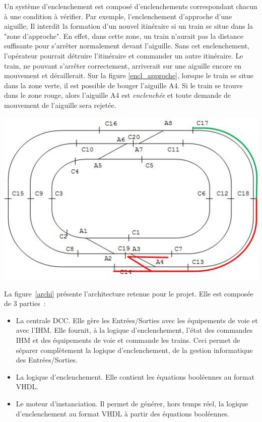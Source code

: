 Un système d'enclenchement est composé d'enclenchements correspondant
chacun à une condition à vérifier. Par exemple, l'{enclenchement
d'approche d'une aiguille}; Il interdit la formation d'un 
nouvel itinéraire si un train se situe dans la "zone d'approche".
En effet, dans cette zone, un train
n'aurait pas la distance suffisante pour s'arrêter normalement devant
l'aiguille.  Sans cet enclenchement, l'opérateur pourrait détruire
l'itinéraire et commander un autre itinéraire. Le train, ne pouvant
s'arrêter correctement, arriverait sur une aiguille encore en
mouvement et déraillerait.
Sur la figure \ref{encl_approche}, lorsque le train se situe dans la
zone verte, il est possible de bouger l'aiguille A4. Si le train se
trouve dans le zone rouge, alors l'aiguille A4 est \emph{enclenchée}
et toute demande de mouvement de l'aiguille sera rejetée.


\begin{center}
\includegraphics[scale=0.6]{zone_approche.jpg}
\label{encl_approche}%
\end{center}

\newpage
  
La figure~\ref{archi} présente l'architecture retenue pour le
projet. Elle est composée de 3 parties~:
  \begin{itemize}
    \item La centrale DCC. Elle gère les Entrées/Sorties avec les
      équipements de voie et avec l'IHM. Elle fournit, à la logique
      d'enclenchement, l'état des commandes IHM et des équipements de
      voie et commande les trains. Ceci permet de séparer complètement
      la logique d'enclenchement, de la gestion informatique des
      Entrées/Sorties.
    \item La logique d'enclenchement. Elle contient les équations
      booléennes au format VHDL. 
    \item Le moteur d'instanciation. Il permet de générer, hors temps réel,
      la logique d'enclenchement au format VHDL à partir des équations
      booléennes.
  \end{itemize}

